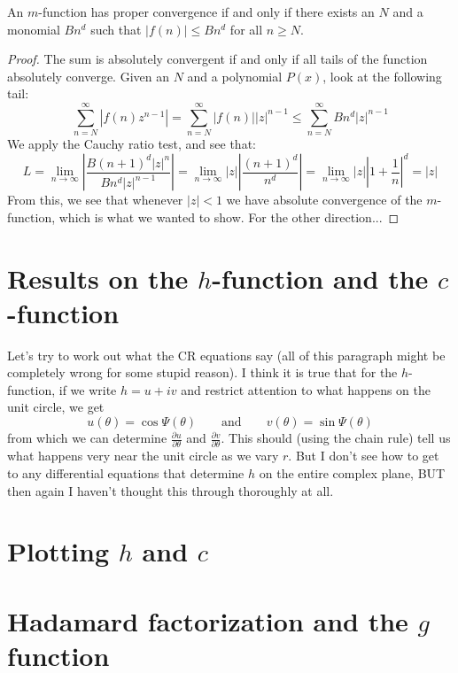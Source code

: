 \documentclass[a4paper]{amsart}
\begin{document}
\begin{proposition}
  An $m$-function has proper convergence if and only if there exists an $N$ and a monomial $Bn^d$ such that $|f(n)| \le Bn^d$ for all $n \ge N$.
\end{proposition}

\begin{proof}
  The sum is absolutely convergent if and only if all tails of the function absolutely converge. Given an $N$ and a polynomial $P(x)$, look at the following tail:
  $$\sum_{n = N}^{\infty} |f(n)z^{n - 1}| = \sum_{n = N}^{\infty} |f(n)| |z|^{n - 1} \le \sum_{n = N}^{\infty} Bn^d |z|^{n - 1}$$
  We apply the Cauchy ratio test, and see that:
  $$L = \lim_{n \to \infty} \left|\frac{B(n + 1)^d |z|^{n}}{Bn^d |z|^{n - 1}}\right| = \lim_{n \to \infty} |z|\left|\frac{(n + 1)^d}{n^d}\right| = \lim_{n \to \infty} |z|\left|1 + \frac{ 1}{n}\right|^d = |z|$$
  From this, we see that whenever $|z| < 1$ we have absolute convergence of the $m$-function, which is what we wanted to show. For the other direction... 

\end{proof}

\section{Results on the $h$-function and the $c$-function}

Let's try to work out what the CR equations say (all of this paragraph might be completely wrong for some stupid reason). I think it is true that for the $h$-function, if we write $h = u+ iv$ and restrict attention to what happens on the unit circle, we get
$$ u(\theta) = \cos \Psi(\theta) \quad \quad \textrm{and} \quad \quad v(\theta) =  \sin \Psi(\theta) $$
from which we can determine $\frac{\partial u}{\partial \theta}$ and $\frac{\partial v}{\partial \theta}$. This should (using the chain rule) tell us what happens very near the unit circle as we vary $r$. But I don't see how to get to any differential equations that determine $h$ on the entire complex plane, BUT then again I haven't thought this through thoroughly at all.

\section{Plotting $h$ and $c$}




\section{Hadamard factorization and the $g$ function}
\end{document}

